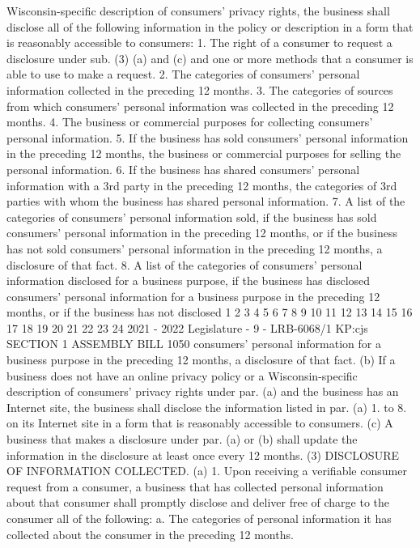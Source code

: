 Wisconsin-specific description of consumers' privacy rights, the business shall
disclose all of the following information in the policy or description in a form that is
reasonably accessible to consumers:
1. The right of a consumer to request a disclosure under sub. (3) (a) and (c) and
one or more methods that a consumer is able to use to make a request.
2. The categories of consumers' personal information collected in the preceding
12 months.
3. The categories of sources from which consumers' personal information was
collected in the preceding 12 months.
4. The business or commercial purposes for collecting consumers' personal
information.
5. If the business has sold consumers' personal information in the preceding
12 months, the business or commercial purposes for selling the personal information.
6. If the business has shared consumers' personal information with a 3rd party
in the preceding 12 months, the categories of 3rd parties with whom the business has
shared personal information.
7. A list of the categories of consumers' personal information sold, if the
business has sold consumers' personal information in the preceding 12 months, or
if the business has not sold consumers' personal information in the preceding 12
months, a disclosure of that fact.
8. A list of the categories of consumers' personal information disclosed for a
business purpose, if the business has disclosed consumers' personal information for
a business purpose in the preceding 12 months, or if the business has not disclosed
1
2
3
4
5
6
7
8
9
10
11
12
13
14
15
16
17
18
19
20
21
22
23
24
2021 - 2022 Legislature - 9 - LRB-6068/1
KP:cjs
SECTION 1 ASSEMBLY BILL 1050
consumers' personal information for a business purpose in the preceding 12 months,
a disclosure of that fact.
(b) If a business does not have an online privacy policy or a Wisconsin-specific
description of consumers' privacy rights under par. (a) and the business has an
Internet site, the business shall disclose the information listed in par. (a) 1. to 8. on
its Internet site in a form that is reasonably accessible to consumers.
(c) A business that makes a disclosure under par. (a) or (b) shall update the
information in the disclosure at least once every 12 months.
(3) DISCLOSURE OF INFORMATION COLLECTED. (a) 1. Upon receiving a verifiable
consumer request from a consumer, a business that has collected personal
information about that consumer shall promptly disclose and deliver free of charge
to the consumer all of the following:
a. The categories of personal information it has collected about the consumer
in the preceding 12 months.
